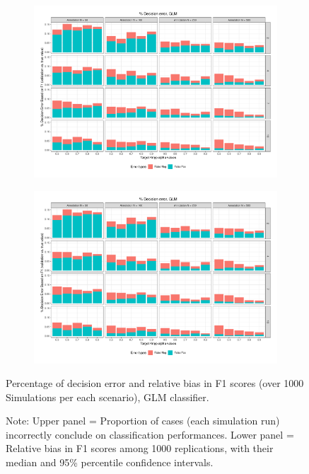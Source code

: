\documentclass[man, 12pt, a4paper, nolmodern, noextraspace]{apa6}
\begin{document}
\begin{figure}
    \centering
    \begin{subfigure}[t]{0.95\textwidth}
        \centering
        \includegraphics[clip, width=\linewidth, page = 1]{Results/GLM_summary_05.pdf} 
    \end{subfigure}
    \begin{subfigure}[t]{0.95\textwidth}
        \centering
        \includegraphics[clip, width=\linewidth, page = 2]{Results/GLM_summary_05.pdf} 
    \end{subfigure}
    
    \captionsetup{format=hang}
    \caption{Percentage of decision error and relative bias in F1 scores (over 1000 Simulations per each scenario), GLM classifier.} 
    \label{fig:Figure3}
    \captionsetup{font=small}
    \caption*{Note: Upper panel = Proportion of cases (each simulation run) incorrectly conclude on classification performances. Lower panel = Relative bias in F1 scores among 1000 replications, with their median and 95\% percentile confidence intervals.}
\end{figure}     
\end{document}
